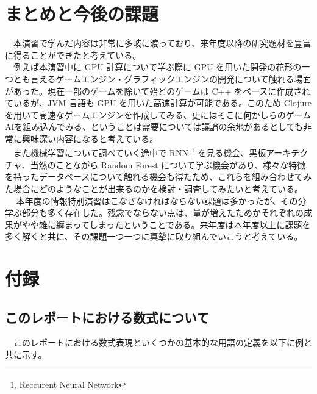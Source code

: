 \documentclass{scrartcl}
\begin{document}
\section{まとめと今後の課題}
\label{sec:org6cbd844}
　本演習で学んだ内容は非常に多岐に渡っており、来年度以降の研究題材を豊富に得ることができたと考えている。\\
　例えば本演習中に GPU 計算について学ぶ際に GPU を用いた開発の花形の一つとも言えるゲームエンジン・グラフィックエンジンの開発について触れる場面があった。現在一部のゲームを除いて殆どのゲームは C++ をベースに作成されているが、JVM 言語も GPU を用いた高速計算が可能である。このため Clojure を用いて高速なゲームエンジンを作成してみる、更にはそこに何かしらのゲームAIを組み込んでみる、ということは需要については議論の余地があるとしても非常に興味深い内容になると考えている。\\
　また機械学習について調べていく途中で RNN \footnote{Reccurent Neural Network} を見る機会、黒板アーキテクチャ、当然のことながら Random Forest について学ぶ機会があり、様々な特徴を持ったデータベースについて触れる機会も得たため、これらを組み合わせてみた場合にどのようなことが出来るのかを検討・調査してみたいと考えている。\\
　 本年度の情報特別演習はこなさなければならない課題は多かったが、その分学ぶ部分も多く存在した。残念でならない点は、量が増えたためかそれぞれの成果がやや雑に纏まってしまったということである。来年度は本年度以上に課題を多く解くと共に、その課題一つ一つに真摯に取り組んでいこうと考えている。\\
\section{付録}
\label{sec:orged6c534}
\subsection{このレポートにおける数式について}
\label{sec:orgcd41543}
　このレポートにおける数式表現といくつかの基本的な用語の定義を以下に例と共に示す。\\
\end{document}
